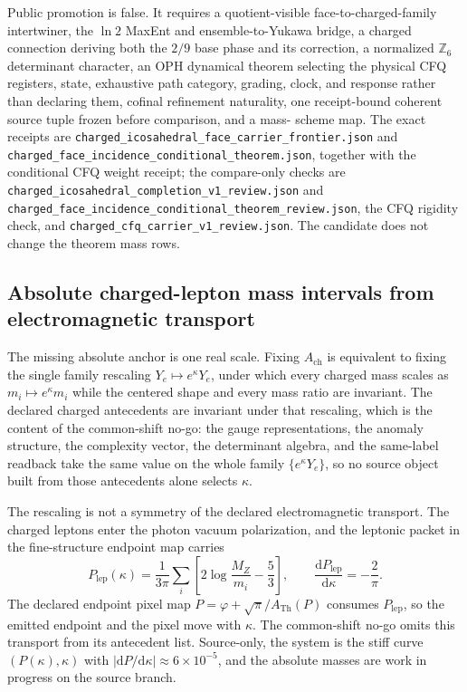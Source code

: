 \documentclass[11pt]{article}
\begin{document}
Public promotion is false.  It requires a quotient-visible face-to-charged-family
intertwiner, the \(\ln2\) MaxEnt and ensemble-to-Yukawa bridge, a charged
connection deriving both the \(2/9\) base phase and its correction, a normalized
\(\mathbb Z_6\) determinant character, an OPH dynamical theorem selecting the
physical CFQ registers, state, exhaustive path category, grading, clock, and
response rather than declaring them, cofinal refinement naturality,
one receipt-bound coherent source tuple frozen before comparison, and a mass-
scheme map.  The exact receipts are
\texttt{charged\_icosahedral\_face\_carrier\_frontier.json} and
\texttt{charged\_face\_incidence\_conditional\_theorem.json}, together with the
conditional CFQ weight receipt; the compare-only
checks are \texttt{charged\_icosahedral\_completion\_v1\_review.json} and
\texttt{charged\_face\_incidence\_conditional\_theorem\_review.json}, the CFQ
rigidity check, and \texttt{charged\_cfq\_carrier\_v1\_review.json}.  The
candidate does not change the theorem mass rows.

\subsection{Absolute charged-lepton mass intervals from electromagnetic transport}\label{charged-kappa-interval}

The missing absolute anchor is one real scale. Fixing \(A_{\mathrm{ch}}\) is equivalent to fixing
the single family rescaling \(Y_e\mapsto e^{\kappa}Y_e\), under which every charged mass scales as
\(m_i\mapsto e^{\kappa}m_i\) while the centered shape and every mass ratio are invariant. The
declared charged antecedents are invariant under that rescaling, which is the content of the
common-shift no-go: the gauge representations, the anomaly structure, the complexity vector, the
determinant algebra, and the same-label readback take the same value on the whole family
\(\{e^{\kappa}Y_e\}\), so no source object built from those antecedents alone selects \(\kappa\).

The rescaling is not a symmetry of the declared electromagnetic transport. The charged leptons
enter the photon vacuum polarization, and the leptonic packet in the fine-structure endpoint map
carries
\[
P_{\mathrm{lep}}(\kappa)=\frac{1}{3\pi}\sum_{i}\left[2\log\frac{M_Z}{m_i}-\frac53\right],
\qquad
\frac{\mathrm{d}P_{\mathrm{lep}}}{\mathrm{d}\kappa}=-\frac{2}{\pi}.
\]
The declared endpoint pixel map \(P=\varphi+\sqrt\pi/A_{\mathrm{Th}}(P)\) consumes \(P_{\mathrm{lep}}\),
so the emitted endpoint and the pixel move with \(\kappa\). The common-shift no-go omits this
transport from its antecedent list. Source-only, the system is the stiff curve \((P(\kappa),\kappa)\)
with \(|\mathrm{d}P/\mathrm{d}\kappa|\approx6\times10^{-5}\), and the absolute masses are work in
progress on the source branch.
\end{document}
